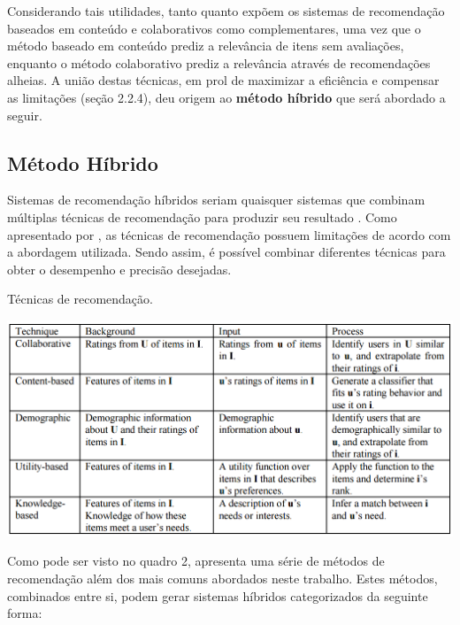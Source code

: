\documentclass[12pt, openright, oneside, a4paper, brazil]{abntex2}
\begin{document}
Considerando tais utilidades, tanto  quanto  expõem os sistemas de recomendação baseados em conteúdo e colaborativos como complementares, uma vez que o método baseado em conteúdo prediz a relevância de itens sem avaliações, enquanto o método colaborativo prediz a relevância através de recomendações alheias. A união destas técnicas, em prol de maximizar a eficiência e compensar as limitações (seção 2.2.4), deu origem ao \textbf{método híbrido} que será abordado a seguir.

\subsection{Método Híbrido}

Sistemas de recomendação híbridos seriam quaisquer sistemas que combinam múltiplas técnicas de recomendação para produzir seu resultado \cite{burke2002hybrid, burke2007hybrid}. Como apresentado por , as técnicas de recomendação possuem limitações de acordo com a abordagem utilizada. Sendo assim, é possível combinar diferentes técnicas para obter o desempenho e precisão desejadas.

\begin{quadro}[h!tp]
	\caption{\label{recommender_systems}Técnicas de recomendação.}

	\begin{center}
		\includegraphics[scale=0.6]{images/recommender_systems.png}
	\end{center}
\end{quadro}

Como pode ser visto no quadro 2,  apresenta uma série de métodos de recomendação além dos mais comuns abordados neste trabalho. Estes métodos, combinados entre si, podem gerar sistemas híbridos categorizados da seguinte forma:
\end{document}

